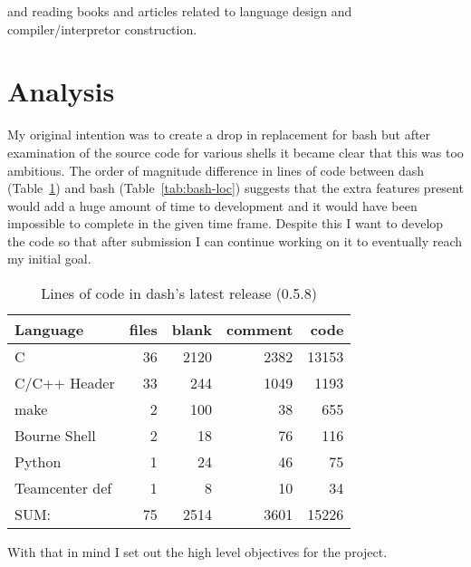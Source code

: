 and reading books\cite{LEX-AND-YACC} and articles\cite{BUILD-INTERP,GOPHER-LEXING-BLOG} related to language design and compiler/interpretor construction. 




\section{Analysis} %

My original intention was to create a drop in replacement for bash but after examination of the source code for various shells it became clear that this was too ambitious.
The order of magnitude difference in lines of code between dash (Table~\ref{tab:dash-loc}) and bash (Table~\ref{tab:bash-loc}) suggests that the extra features present would add a huge amount of time to development and it would have been impossible to complete in the given time frame.
Despite this I want to develop the code so that after submission I can continue working on it to eventually reach my initial goal.

\begin{table}[hp]
\centering
\caption{Lines of code in dash's latest release (0.5.8)}
\label{tab:dash-loc}
\begin{tabular}{@{}lrrrr@{}}
\toprule
Language       & files & blank & comment & code  \\ \midrule
C              & 36    & 2120  & 2382    & 13153 \\
C/C++ Header   & 33    & 244   & 1049    & 1193  \\
make           & 2     & 100   & 38      & 655   \\
Bourne Shell   & 2     & 18    & 76      & 116   \\
Python         & 1     & 24    & 46      & 75    \\
Teamcenter def & 1     & 8     & 10      & 34    \\ \midrule
SUM:           & 75    & 2514  & 3601    & 15226 \\ \bottomrule
\end{tabular}
\end{table}

With that in mind I set out the high level objectives for the project.

